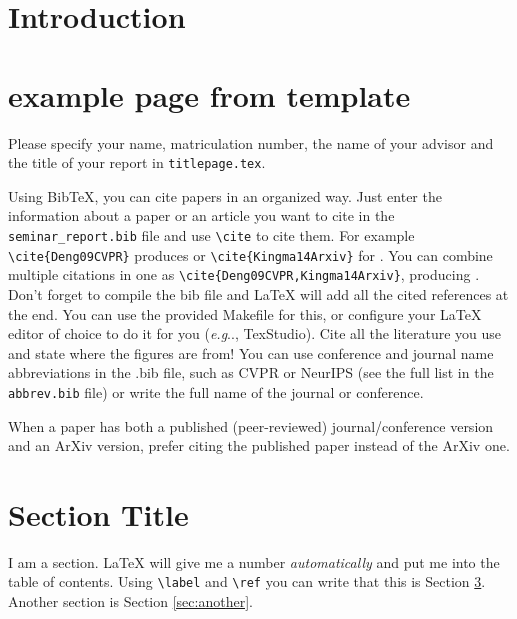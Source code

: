 \documentclass[twoside,a4paper,article]{combine}
\makeatletter
\DeclareRobustCommand\onedot{\futurelet\@let@token\@onedot}
\def\@onedot{\ifx\@let@token.\else.\null\fi\xspace}
\def\eg{\emph{e.g}\onedot} \def\Eg{\emph{E.g}\onedot}
\makeatother
\begin{document}


\begin{abstract}
\end{abstract}

\tableofcontents
\newpage

\section{Introduction}


\newpage
\section{example page from template}
Please specify your name, matriculation number, the name of your advisor and the title of your report in 
\verb+titlepage.tex+.

Using BibTeX, you can cite papers in an organized way.
Just enter the information about a paper or an article you want to cite in the \texttt{seminar\_report.bib} file and use \verb+\cite+ to cite them. For example \verb+\cite{Deng09CVPR}+ produces \cite{Deng09CVPR} or \verb+\cite{Kingma14Arxiv}+ for \cite{Kingma14Arxiv}. You can combine multiple citations in one as \verb+\cite{Deng09CVPR,Kingma14Arxiv}+, producing \cite{Deng09CVPR,Kingma14Arxiv}.
Don't forget to compile the bib file and LaTeX will add all the cited references at the end. You can use the provided Makefile for this, or configure your LaTeX editor of choice to do it for you (\eg, TexStudio).
Cite all the literature you use and state where the figures are from! You can use conference and journal name abbreviations in the .bib file, such as CVPR or NeurIPS (see the full list in the \texttt{abbrev.bib} file) or write the full name of the journal or conference.

When a paper has both a published (peer-reviewed) journal/conference version and an ArXiv version, prefer citing the published paper instead of the ArXiv one.

\section{Section Title}
\label{sec:firstsection}
I am a section. LaTeX will give me a number \emph{automatically} and put me into the table of contents.
Using \verb+\label+ and \verb+\ref+ you can write that this is Section \ref{sec:firstsection}. Another section is Section \ref{sec:another}.
\end{document}
